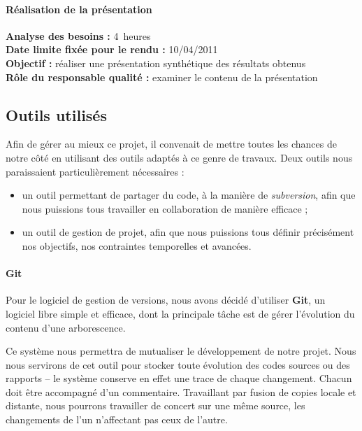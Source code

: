 \paragraph*{Réalisation de la présentation}
\textbf{Analyse des besoins : }4~heures\\
\textbf{Date limite fixée pour le rendu : }10/04/2011\\
\textbf{Objectif : }réaliser une présentation synthétique des résultats obtenus\\
\textbf{Rôle du responsable qualité : } examiner le contenu de la présentation


\subsection{Outils utilisés}
Afin de gérer au mieux ce projet, il convenait de mettre toutes les chances de notre côté en utilisant des outils adaptés à ce genre de travaux. Deux outils nous paraissaient particulièrement nécessaires :
\begin{itemize}
  \item un outil permettant de partager du code, à la manière de \textit{subversion}, afin que nous puissions tous travailler en collaboration de manière efficace ;
  \item un outil de gestion de projet, afin que nous puissions tous définir précisément nos objectifs, nos contraintes temporelles et avancées.
\end{itemize}

\paragraph*{Git\\}

Pour le logiciel de gestion de versions, nous avons décidé d'utiliser \textbf{Git}, un logiciel libre simple et efficace, dont la principale tâche est de gérer l'évolution du contenu d'une arborescence.


Ce système nous permettra de mutualiser le développement de notre projet. Nous nous servirons de cet outil pour stocker toute évolution des codes sources ou des rapports -- le système conserve en effet une trace de chaque changement. Chacun doit être accompagné d'un commentaire. Travaillant par fusion de copies locale et distante, nous pourrons travailler de concert sur une même source, les changements de l'un n'affectant pas ceux de l'autre.

